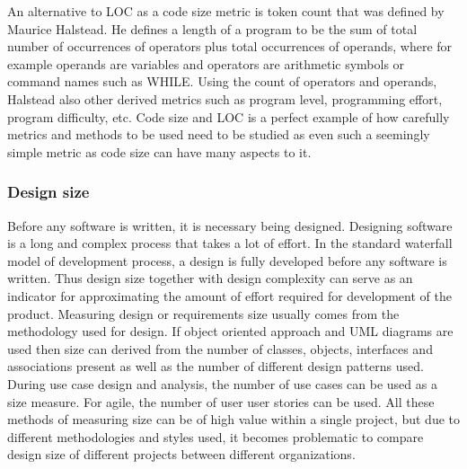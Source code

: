 \documentclass[11pt]{article}
\begin{document}
\par
An alternative to LOC as a code size metric is token count that was defined by Maurice Halstead. He defines a length of a program to be the sum of total number of occurrences of operators plus total occurrences of operands, where for example operands are variables and operators are arithmetic symbols or command names such as WHILE. Using the count of operators and operands, Halstead also other derived metrics such as program level, programming effort, program difficulty, etc.
Code size and LOC is a perfect example of how carefully metrics and methods to be used need to be studied as even such a seemingly simple metric as code size can have many aspects to it.

\subsubsection{Design size}
Before any software is written, it is necessary being designed. Designing software is a long and complex process that takes a lot of effort. In the standard waterfall model of development process, a design is fully developed before any software is written. Thus design size together with design complexity can serve as an indicator for approximating the amount of effort required for development of the product. Measuring design or requirements size usually comes from the methodology used for design. If object oriented approach and UML diagrams are used then size can derived from the number of classes, objects, interfaces and associations present as well as the number of different design patterns used. During use case design and analysis, the number of use cases can be used as a size measure. For agile, the number of user user stories can be used. All these methods of measuring size can be of high value within a single project, but due to different methodologies and styles used, it becomes problematic to compare design size of different projects between different organizations.
\end{document}
